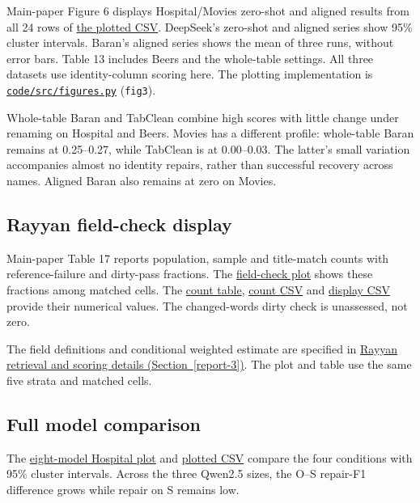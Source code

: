 \documentclass[10pt,a4paper]{article}
\begin{document}
Main-paper Figure 6 displays Hospital/Movies zero-shot and aligned results from all 24 rows of \href{https://github.com/hinsonver/CoRe-Benchmark/blob/main/results/figures/fig3_aligned.csv}{the plotted CSV}. DeepSeek's zero-shot and aligned series show 95\% cluster intervals. Baran's aligned series shows the mean of three runs, without error bars. Table 13 includes Beers and the whole-table settings. All three datasets use identity-column scoring here. The plotting implementation is \href{https://github.com/hinsonver/CoRe-Benchmark/blob/main/code/src/figures.py}{\nolinkurl{code/src/figures.py}} (\texttt{fig3}).

Whole-table Baran and TabClean combine high scores with little change under renaming on Hospital and Beers. Movies has a different profile: whole-table Baran remains at 0.25--0.27, while TabClean is at 0.00--0.03. The latter's small variation accompanies almost no identity repairs, rather than successful recovery across names. Aligned Baran also remains at zero on Movies.

\subsection{Rayyan field-check display}

Main-paper Table 17 reports population, sample and title-match counts with reference-failure and dirty-pass fractions. The \href{https://github.com/hinsonver/CoRe-Benchmark/blob/main/paper/latex/figures/fig5_rayyan.pdf}{field-check plot} shows these fractions among matched cells. The \href{https://github.com/hinsonver/CoRe-Benchmark/blob/main/paper/latex/tables/rayyan.tex}{count table}, \href{https://github.com/hinsonver/CoRe-Benchmark/blob/main/results/figures/fig5_rayyan.csv}{count CSV} and \href{https://github.com/hinsonver/CoRe-Benchmark/blob/main/results/figures/fig5_rayyan_display.csv}{display CSV} provide their numerical values. The changed-words dirty check is unassessed, not zero.

The field definitions and conditional weighted estimate are specified in \hyperlink{companion-3}{Rayyan retrieval and scoring details (Section~\ref{report-3})}. The plot and table use the same five strata and matched cells.

\subsection{Full model comparison}

The \href{https://github.com/hinsonver/CoRe-Benchmark/blob/main/paper/latex/figures/fig6_scale.pdf}{eight-model Hospital plot} and \href{https://github.com/hinsonver/CoRe-Benchmark/blob/main/results/figures/fig6_scale.csv}{plotted CSV} compare the four conditions with 95\% cluster intervals. Across the three Qwen2.5 sizes, the O--S repair-F1 difference grows while repair on S remains low.
\end{document}
